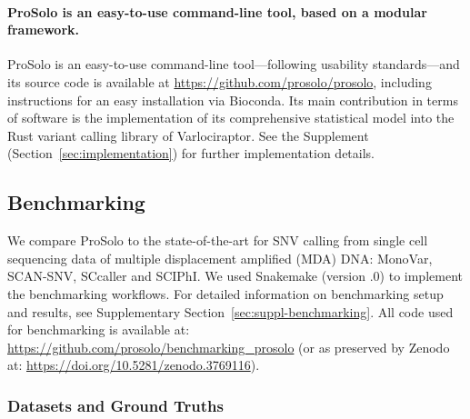 \documentclass[12pt,inline]{wlscirep}
\begin{document}
\paragraph{ProSolo is an easy-to-use command-line tool, based on a modular framework.}

ProSolo is an easy-to-use command-line tool---following usability standards\cite{taschuk_ten_2017}---and its source code is available at \url{https://github.com/prosolo/prosolo}, including instructions for an easy installation via Bioconda\cite{gruning_bioconda:_2018}.
Its main contribution in terms of software is the implementation of its comprehensive statistical model into the Rust variant calling library of Varlociraptor\cite{koster_varlociraptor_2020}.
See the Supplement (Section~\ref{sec:implementation}) for further implementation details.

\subsection{Benchmarking}

We compare ProSolo to the state-of-the-art for SNV calling from single cell sequencing data of multiple displacement amplified (MDA) DNA: MonoVar\cite{zafar_monovar:_2016}, SCAN-SNV\cite{luquette_identification_2019}, SCcaller\cite{dong_accurate_2017} and SCIPhI\cite{singer_single-cell_2018}. We used Snakemake\cite{koster_snakemakescalable_2012} (version {.0}) to implement the benchmarking workflows.
For detailed information on benchmarking setup and results, see Supplementary Section~\ref{sec:suppl-benchmarking}.
All code used for benchmarking is available at: \url{https://github.com/prosolo/benchmarking_prosolo} (or as preserved by Zenodo at: \url{https://doi.org/10.5281/zenodo.3769116}).

\subsubsection{Datasets and Ground Truths}
\end{document}
